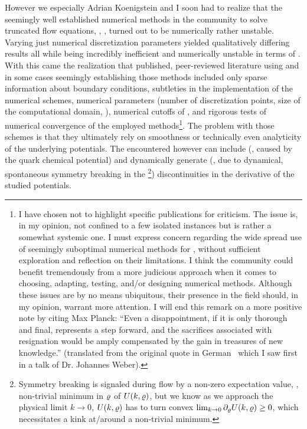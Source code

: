 However we \dash{} especially Adrian Koenigstein and I \dash{} soon had to realize that the seemingly well established numerical methods in the \frg{} community to solve truncated flow equations, \ie{}, \pdes{}, turned out to be numerically rather unstable.
Varying just numerical discretization parameters yielded qualitatively differing results all while being incredibly inefficient and numerically unstable in terms of \rgscaleevolution{}. 
With this came the realization that published, peer-reviewed literature using and in some cases seemingly establishing those methods included only sparse information about boundary conditions, subtleties in the implementation of the numerical schemes, numerical parameters (number of discretization points, size of the computational domain, \etc{}), numerical \ir{} cutoffs of \rgscaleevolution{}, and rigorous tests of numerical convergence of the employed methods\footnote{%
	I have chosen not to highlight specific publications for criticism.
	The issue is, in my opinion, not confined to a few isolated instances but is rather a somewhat systemic one.
	I must express concern regarding the wide spread use of seemingly suboptimal numerical methods for \pdes{}, without sufficient exploration and reflection on their limitations.
	I think the \frg{} community could benefit tremendously from a more judicious approach when it comes to choosing, adapting, testing, and/or designing numerical methods.
	Although these issues are by no means ubiquitous, their presence in the field should, in my opinion, warrant more attention.
	I will end this remark on a more positive note by citing Max Planck: ``Even a disappointment, if it is only thorough and final, represents a step forward, and the sacrifices associated with resignation would be amply compensated by the gain in treasures of new knowledge.'' (translated from the original quote in German~\cite{PlanckQuote} which I saw first in a talk of Dr. Johannes Weber).%
}.
The problem with those schemes is that they ultimately rely on smoothness or technically even analyticity of the underlying potentials.
The encountered \pdes{} however can include (\eg{}, caused by the quark chemical potential) and dynamically generate (\eg{}, due to dynamical, spontaneous symmetry breaking in the \ir{}\footnote{%
	Symmetry breaking is signaled during \frg{} flow by a non-zero expectation value, \ie{}, non-trivial minimum in $\varrho$ of $U(k,\varrho)$, but we know as we approach the physical \ir{} limit $k\rightarrow 0$, $U(k,\varrho)$ has to turn convex ${\lim_{k\rightarrow 0}\partial_\varrho U(k,\varrho)\geq 0}$, which necessitates a kink at/around a non-trivial minimum.
}) discontinuities in the derivative of the studied potentials.

